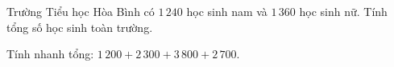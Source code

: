 \begin{ex} %
Trường Tiểu học Hòa Bình có $1\,240$ học sinh nam và $1\,360$ học sinh nữ. Tính tổng số học sinh toàn trường.
\end{ex}

\begin{ex} %
Tính nhanh tổng: $1\,200 + 2\,300 + 3\,800 + 2\,700$.
\end{ex}
